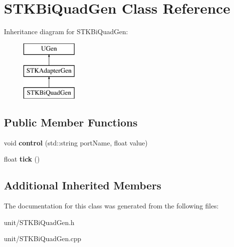 \hypertarget{classSTKBiQuadGen}{}\section{S\+T\+K\+Bi\+Quad\+Gen Class Reference}
\label{classSTKBiQuadGen}
Inheritance diagram for S\+T\+K\+Bi\+Quad\+Gen\+:\begin{figure}[H]
\begin{center}
\leavevmode
\includegraphics[height=3.000000cm]{classSTKBiQuadGen}
\end{center}
\end{figure}
\subsection*{Public Member Functions}
\begin{DoxyCompactItemize}
\item 
void {\bfseries control} (std\+::string port\+Name, float value)\hypertarget{classSTKBiQuadGen_afbaea4e23ab453fdeaa0069ddd8002a6}{}\label{classSTKBiQuadGen_afbaea4e23ab453fdeaa0069ddd8002a6}

\item 
float {\bfseries tick} ()\hypertarget{classSTKBiQuadGen_aeaa64c8ff587d9a9089b4cf3276255b9}{}\label{classSTKBiQuadGen_aeaa64c8ff587d9a9089b4cf3276255b9}

\end{DoxyCompactItemize}
\subsection*{Additional Inherited Members}


The documentation for this class was generated from the following files\+:\begin{DoxyCompactItemize}
\item 
unit/S\+T\+K\+Bi\+Quad\+Gen.\+h\item 
unit/S\+T\+K\+Bi\+Quad\+Gen.\+cpp\end{DoxyCompactItemize}
